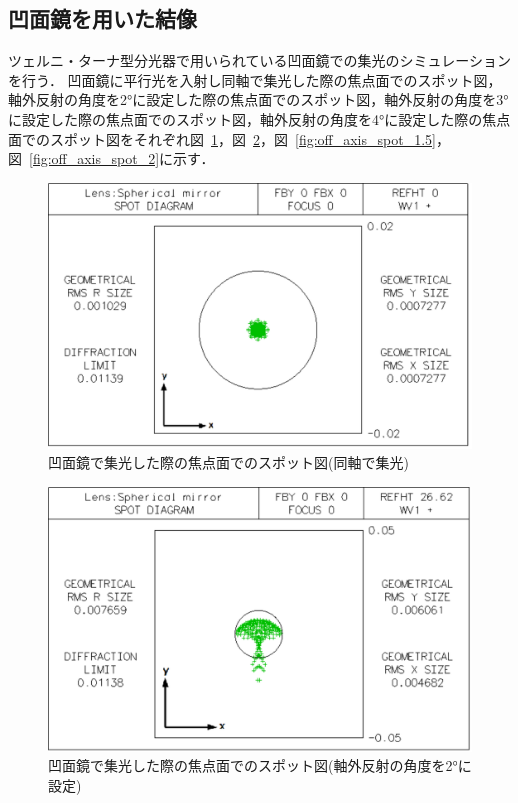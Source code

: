 \subsection{凹面鏡を用いた結像}
ツェルニ・ターナ型分光器で用いられている凹面鏡での集光のシミュレーションを行う．
凹面鏡に平行光を入射し同軸で集光した際の焦点面でのスポット図，軸外反射の角度を2°に設定した際の焦点面でのスポット図，軸外反射の角度を3°に設定した際の焦点面でのスポット図，軸外反射の角度を4°に設定した際の焦点面でのスポット図をそれぞれ図\ \ref{fig:off_axis_spot_0}，図\ \ref{fig:off_axis_spot_1}，図\ \ref{fig:off_axis_spot_1.5}，図\ \ref{fig:off_axis_spot_2}に示す．
\begin{figure}[htbp]
    \centering
    \includegraphics[scale=0.5]{figure/off_axis_spot_0.pdf}
    \caption{凹面鏡で集光した際の焦点面でのスポット図(同軸で集光)}
    \label{fig:off_axis_spot_0}
\end{figure}
\begin{figure}[htbp]
    \centering
    \includegraphics[scale=0.5]{figure/off_axis_spot_1.pdf}
    \caption{凹面鏡で集光した際の焦点面でのスポット図(軸外反射の角度を2°に設定)}
    \label{fig:off_axis_spot_1}
\end{figure}
